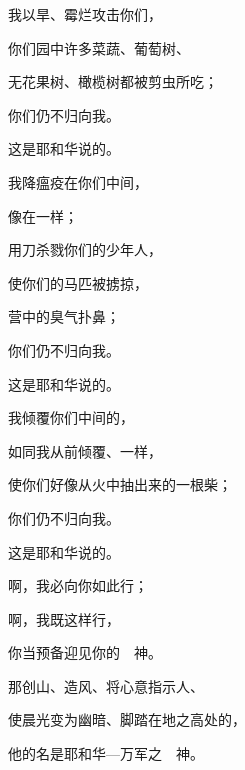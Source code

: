 {\par }{\BB \par }{\Q {}我以旱{}、霉烂攻击你们，
\par }{\Q 你们园中许多菜蔬、葡萄树、
\par }{\Q 无花果树、橄榄树都被剪虫所吃；
\par }{\Q 你们仍不归向我。
\par }{\Q 这是耶和华说的。
\par }{\BB \par }{\Q {}我降瘟疫在你们中间，
\par }{\Q 像在{}一样；
\par }{\Q 用刀杀戮你们的少年人，
\par }{\Q 使你们的马匹被掳掠，
\par }{\Q 营中{}的臭气扑鼻；
\par }{\Q 你们仍不归向我。
\par }{\Q 这是耶和华说的。
\par }{\BB \par }{\Q {}我倾覆你们中间的{}，
\par }{\Q 如同我从前倾覆{}、{}一样，
\par }{\Q 使你们好像从火中抽出来的一根柴；
\par }{\Q 你们仍不归向我。
\par }{\Q 这是耶和华说的。
\par }{\BB \par }{\Q {}啊，我必向你如此行；
\par }{啊，我既这样行，
\par }{\Q 你当预备迎见你的　神。
\par }{\BB \par }{\Q {}那创山、造风、将心意指示人、
\par }{\Q 使晨光变为幽暗、脚踏在地之高处的，
\par }{\Q 他的名是耶和华—万军之　神。

}
